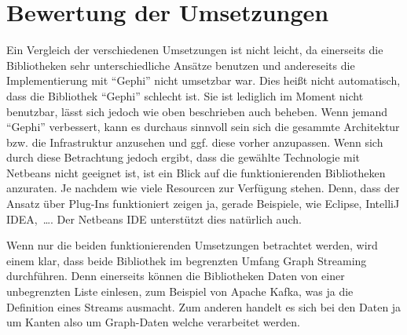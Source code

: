 \section{Bewertung der Umsetzungen}
Ein Vergleich der verschiedenen Umsetzungen ist nicht leicht, da einerseits die
Bibliotheken sehr unterschiedliche Ansätze benutzen und andereseits die
Implementierung mit \enquote{Gephi} nicht umsetzbar war. Dies heißt nicht
automatisch, dass die Bibliothek \enquote{Gephi} schlecht ist. Sie ist lediglich
im Moment nicht benutzbar, lässt sich jedoch wie oben beschrieben auch beheben.
Wenn jemand \enquote{Gephi} verbessert, kann es durchaus sinnvoll sein sich die
gesammte Architektur bzw. die Infrastruktur anzusehen und ggf. diese vorher
anzupassen. Wenn sich durch diese Betrachtung jedoch ergibt, dass die gewählte
Technologie mit Netbeans nicht geeignet ist, ist ein Blick auf die
funktionierenden Bibliotheken anzuraten. Je nachdem wie viele Resourcen zur
Verfügung stehen. Denn, dass der Ansatz über Plug-Ins funktioniert zeigen ja,
gerade Beispiele, wie Eclipse, IntelliJ IDEA,~\dots . Der Netbeans \gls{IDE}
unterstützt dies natürlich auch.

Wenn nur die beiden funktionierenden Umsetzungen betrachtet werden, wird einem
klar, dass beide Bibliothek im begrenzten Umfang Graph Streaming durchführen.
Denn einerseits können die Bibliotheken Daten von einer unbegrenzten Liste
einlesen, zum Beispiel von Apache Kafka, was ja die Definition eines Streams
ausmacht. Zum anderen handelt es sich bei den Daten ja um Kanten also um
Graph-Daten welche verarbeitet werden.
